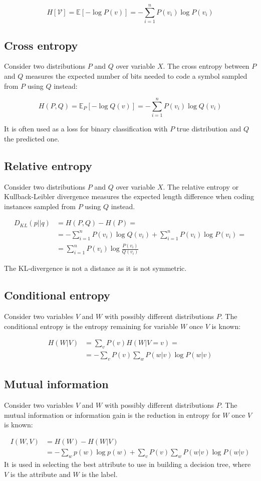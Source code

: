 	$$H[\mathcal{V}] = \mathbb{E}[-\log P(v)] = -\sum\limits_{i=1}^nP(v_i)\log P(v_i)$$

	\subsection{Cross entropy}
	Consider two distributions $P$ and $Q$ over variable $X$.
	The cross entropy between $P$ and $Q$ measures the expected number of bits needed to code a symbol sampled from $P$ using $Q$ instead:

	$$H(P,Q) = \mathbb{E}_P[-\log Q(v)] = -\sum\limits_{i=1}^nP(v_i)\log Q(v_i)$$

	It is often used as a loss for binary classification with $P$ true distribution and $Q$ the predicted one.

	\subsection{Relative entropy}
	Consider two distributions $P$ and $Q$ over variable $X$.
	The relative entropy or Kullback-Leibler divergence measures the expected length difference when coding instances sampled from $P$ using $Q$ instead.

	\begin{align*}
		D_{KL}(p||q) &= H(P,Q) - H(P)=\\
			     &=-\sum\limits_{i=1}^nP(v_i)\log Q(v_i) + \sum\limits_{i=1}^nP(v_i)\log P(v_i)=\\
			     & = \sum\limits_{i=1}^nP(v_i)\log\frac{P(v_i)}{Q(v_i)}
	\end{align*}

	The KL-divergence is not a distance as it is not symmetric.

	\subsection{Conditional entropy}
	Consider two variables $V$ and $W$ with possibly different distributions $P$.
	The conditional entropy is the entropy remaining for variable $W$ once $V$ is known:

	\begin{align*}
		H(W|V) &= \sum\limits_v P(v)H(W|V=v)=\\
		       &=-\sum\limits_{v}P(v)\sum\limits_wP(w|v)\log P(w|v)
	\end{align*}

	\subsection{Mutual information}
	Consider two variables $V$ and $W$ with possibly different distributions $P$.
	The mutual information or information gain is the reduction in entropy for $W$ once $V$ is known:

	\begin{align*}
		I(W, V) &= H(W) - H(W|V)\\
			&=-\sum\limits_w p(w)\log p(w) + \sum\limits_{v}P(v)\sum\limits_wP(w|v)\log P(w|v)
	\end{align*}
	It is used in selecting the best attribute to use in building a decision tree, where $V$ is the attribute and $W$ is the label.

